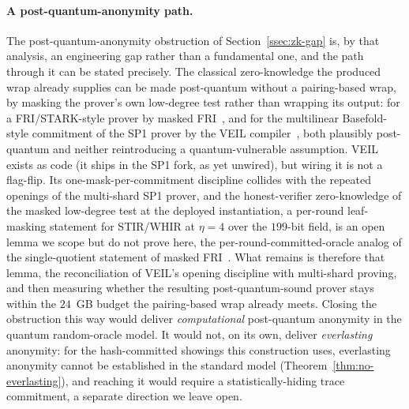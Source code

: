 \paragraph{A post-quantum-anonymity path.}
The post-quantum-anonymity obstruction of Section~\ref{ssec:zk-gap} is, by that analysis, an engineering gap rather than a fundamental one, and the path through it can be stated precisely. The classical zero-knowledge the produced wrap already supplies can be made post-quantum without a pairing-based wrap, by masking the prover's own low-degree test rather than wrapping its output: for a {FRI}/{STARK}-style prover by masked {FRI}~\cite{cryptoeprint:2024/1037}, and for the multilinear Basefold-style commitment of the SP1 prover by the VEIL compiler~\cite{cryptoeprint:2026/683}, both plausibly post-quantum and neither reintroducing a quantum-vulnerable assumption. VEIL exists as code (it ships in the SP1 fork, as yet unwired), but wiring it is not a flag-flip. Its one-mask-per-commitment discipline collides with the repeated openings of the multi-shard SP1 prover, and the honest-verifier zero-knowledge of the masked low-degree test at the deployed instantiation, a per-round leaf-masking statement for STIR/WHIR at $\eta=4$ over the $199$-bit field, is an open lemma we scope but do not prove here, the per-round-committed-oracle analog of the single-quotient statement of masked {FRI}~\cite{cryptoeprint:2024/1037}. What remains is therefore that lemma, the reconciliation of VEIL's opening discipline with multi-shard proving, and then measuring whether the resulting post-quantum-sound prover stays within the $24$~GB budget the pairing-based wrap already meets. Closing the obstruction this way would deliver \emph{computational} post-quantum anonymity in the quantum random-oracle model. It would not, on its own, deliver \emph{everlasting} anonymity: for the hash-committed showings this construction uses, everlasting anonymity cannot be established in the standard model (Theorem~\ref{thm:no-everlasting}), and reaching it would require a statistically-hiding trace commitment, a separate direction we leave open.


